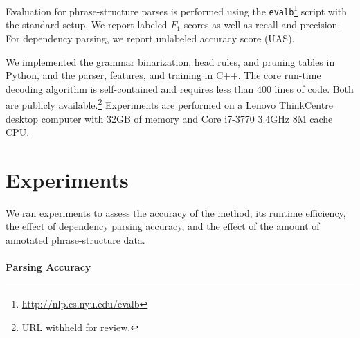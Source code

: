 \documentclass[11pt,letterpaper]{article}
\DeclareMathOperator*{\argmin}{arg\,min}
\newcommand{\nascomment}[1]{\textcolor{blue}{\bf \small [#1 --nas]}}
\begin{document}


Evaluation for phrase-structure parses is performed using the
\texttt{evalb}\footnote{\url{http://nlp.cs.nyu.edu/evalb}} script with the
standard setup. We report labeled $F_1$ scores as well as recall and
precision. For dependency parsing, we report unlabeled accuracy score
(UAS).

We implemented the grammar binarization, head rules, and pruning
tables in Python, and the parser, features, and training in C++. The
core run-time decoding algorithm is self-contained and requires less
than 400 lines of code. Both are publicly available.\footnote{URL withheld
  for review.} Experiments are performed on a Lenovo ThinkCentre desktop computer
with 32GB of memory and  Core i7-3770 3.4GHz 8M cache CPU.



\section{Experiments}
\label{sec:exper}

We ran experiments to assess the accuracy of the method, its runtime
efficiency, the effect of dependency parsing accuracy,
and the effect of the amount of annotated phrase-structure
data.


\paragraph{Parsing Accuracy}
\end{document}
